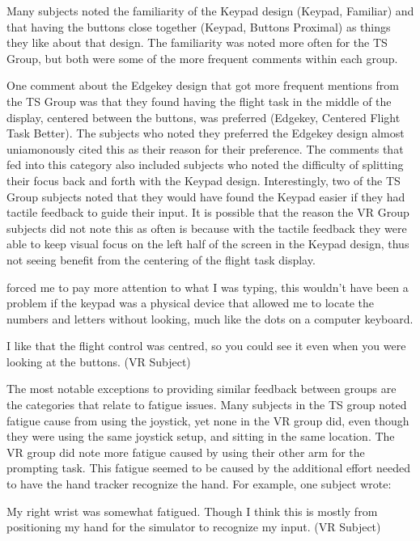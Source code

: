 Many subjects noted the familiarity of the Keypad design (Keypad, Familiar) and that having the buttons close together (Keypad, Buttons Proximal) as things they like about that design.
The familiarity was noted more often for the TS Group, but both were some of the more frequent comments within each group.

One comment about the Edgekey design that got more frequent mentions from the TS Group was that they found having the flight task in the middle of the display, centered between the buttons, was preferred (Edgekey, Centered Flight Task Better).
The subjects who noted they preferred the Edgekey design almost uniamonously cited this as their reason for their preference.
The comments that fed into this category also included subjects who noted the difficulty of splitting their focus back and forth with the Keypad design.
Interestingly, two of the TS Group subjects noted that they would have found the Keypad easier if they had tactile feedback to guide their input.
It is possible that the reason the VR Group subjects did not note this as often is because with the tactile feedback they were able to keep visual focus on the left half of the screen in the Keypad design, thus not seeing benefit from the centering of the flight task display.
\begin{displayquote}[TS Subject]
     forced me to pay more attention to what I was typing, this wouldn't have been a problem if the keypad was a physical device that allowed me to locate the numbers and letters without looking, much like the dots on a computer keyboard.
\end{displayquote}
\begin{displayquote}[VR Subject]
    I like that the flight control was centred, so you could see it even when you were looking at the buttons.
    (VR Subject)
\end{displayquote}

The most notable exceptions to providing similar feedback between groups are the categories that relate to fatigue issues.
Many subjects in the TS group noted fatigue cause from using the joystick, yet none in the VR group did, even though they were using the same joystick setup, and sitting in the same location.
The VR group did note more fatigue caused by using their other arm for the prompting task.
This fatigue seemed to be caused by the additional effort needed to have the hand tracker recognize the hand.
For example, one subject wrote:
\begin{displayquote}[VR Subject]
    My right wrist was somewhat fatigued.  Though I think this is mostly from positioning my hand for the simulator to recognize my input.
    (VR Subject)
\end{displayquote}

